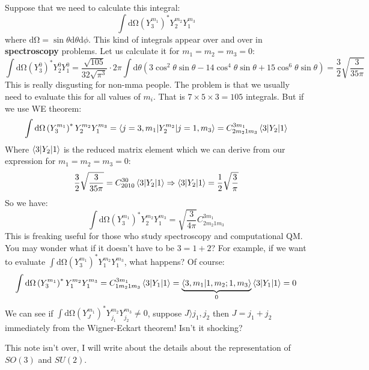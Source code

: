 \documentclass{article}
\begin{document}
	Suppose that we need to calculate this integral:
	\begin{equation*}
		\int \mathrm{d} \si{\ohm}\left( Y_{3}^{m_{1}}\right)^{*} Y_{2}^{m_{2}} Y_{1}^{m_{3}}
	\end{equation*}
	where $\mathrm{d} \si{\ohm}=\sin \theta \mathrm{d} \theta \mathrm{d} \phi $. This kind of integrals appear over and over in \textbf{spectroscopy} problems. Let us calculate it for $m_{1} =m_{2} =m_{3} =0$:
	\begin{equation*}
		\int \mathrm{d} \si{\ohm}\left( Y_{3}^{0}\right)^{*} Y_{2}^{0} Y_{1}^{0} =\frac{\sqrt{105}}{32\sqrt{\pi ^{3}}} \cdot 2\pi \int \mathrm{d} \theta \left( 3\cos^{2} \theta \sin \theta -14\cos^{4} \theta \sin \theta +15\cos^{6} \theta \sin \theta \right) =\frac{3}{2}\sqrt{\frac{3}{35\pi }}
	\end{equation*}
	This is really disgusting for non-mma people. The problem is that we usually need to evaluate this for all values of $m_{i} .$ That is $7\times 5\times 3=105$ integrals. But if we use WE theorem:
	\begin{equation*}
		\int \mathrm{d} \si{\ohm}\left( Y_{3}^{m_{1}}\right)^{*} Y_{2}^{m_{2}} Y_{1}^{m_{3}} =\mel**{j=3,m_{1}}{Y_{2}^{m_{2}}}{j=1,m_{3}} =C_{2m_{2} 1m_{3}}^{3m_{1}}\mel**{3}{Y_{2}}{1}
	\end{equation*}
	Where $\mel**{3}{Y_{2}}{1}$ is the reduced matrix element which we can derive from our expression for $m_{1} =m_{2} =m_{3} =0:$
	\begin{equation*}
		\frac{3}{2}\sqrt{\frac{3}{35\pi }} =C_{2010}^{30}\mel**{3}{Y_{2}}{1} \Rightarrow \mel**{3}{Y_{2}}{1} =\frac{1}{2}\sqrt{\frac{3}{\pi }}
	\end{equation*}
	So we have:
	\begin{equation*}
		\int \mathrm{d} \si{\ohm}\left( Y_{3}^{m_{1}}\right)^{*} Y_{2}^{m_{2}} Y_{1}^{m_{3}} =\sqrt{\frac{3}{4\pi }} C_{2m_{2} 1m_{3}}^{3m_{1}}
	\end{equation*}
	This is freaking useful for those who study spectroscopy and computational QM. You may wonder what if it doesn't have to be $3=1+2$? For example, if we want to evaluate $\int \mathrm{d} \si{\ohm}\left( Y_{3}^{m_{1}}\right)^{*} Y_{1}^{m_{2}} Y_{1}^{m_{3}}$, what happens? Of course:
	\begin{equation*}
		\int \mathrm{d} \si{\ohm}\left( Y_{3}^{m_{1}}\right)^{*} Y_{1}^{m_{2}} Y_{1}^{m_{3}} =C_{1m_{2} 1m_{3}}^{3m_{1}}\mel**{3}{Y_{1}}{1} =\underbrace{\bra{3,m_{1}}\ket{1,m_{2} ;1,m_{3}}}_{0}\mel**{3}{Y_{1}}{1} =0
	\end{equation*}
	We can see if $\int \mathrm{d} \si{\ohm}\left( Y_{J}^{m_{1}}\right)^{*} Y_{j_{1}}^{m_{2}} Y_{j_{2}}^{m_{3}} \neq 0$, suppose $J \rangle j_{1} ,j_{2}$ then $J=j_{1} +j_{2}$ immediately from the Wigner-Eckart theorem! Isn't it shocking? 
	
	
	
	
	
	
	
	
	
	This note isn't over, I will write about the details about the representation of $SO( 3)$ and $SU( 2)$. 
	
\end{document}
